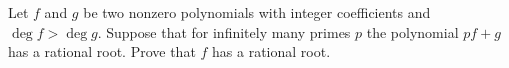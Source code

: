 Let $f$ and $g$ be two nonzero polynomials with integer coefficients and $\deg f>\deg g$.
Suppose that for infinitely many primes $p$ the polynomial $pf+g$ has a rational root.
Prove that $f$ has a rational root.
